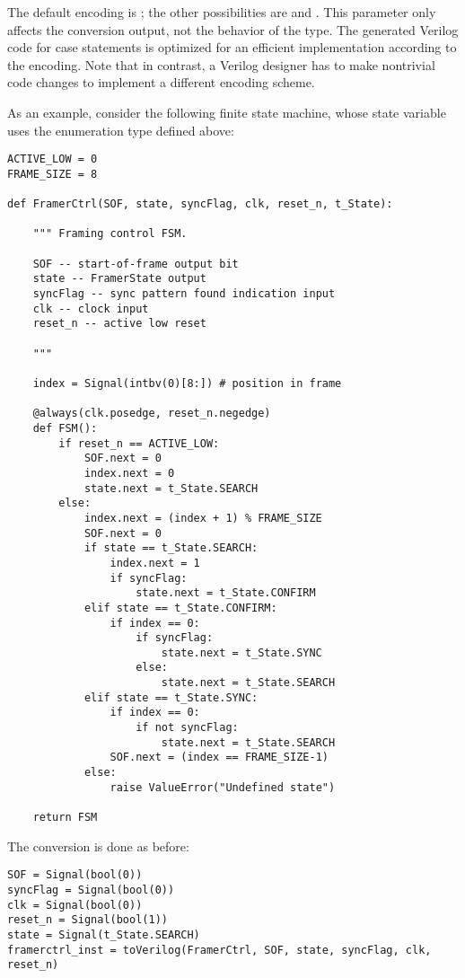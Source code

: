 The default encoding is ; the other possibilities are
 and . This parameter only affects
the conversion output, not the behavior of the type.  The generated
Verilog code for case statements is optimized for an efficient
implementation according to the encoding. Note that in contrast, a
Verilog designer has to make nontrivial code changes to implement a
different encoding scheme.

As an example, consider the following finite state machine, whose
state variable uses the enumeration type defined above:

\begin{verbatim}
ACTIVE_LOW = 0
FRAME_SIZE = 8

def FramerCtrl(SOF, state, syncFlag, clk, reset_n, t_State):
    
    """ Framing control FSM.

    SOF -- start-of-frame output bit
    state -- FramerState output
    syncFlag -- sync pattern found indication input
    clk -- clock input
    reset_n -- active low reset
    
    """
    
    index = Signal(intbv(0)[8:]) # position in frame

    @always(clk.posedge, reset_n.negedge)
    def FSM():
        if reset_n == ACTIVE_LOW:
            SOF.next = 0
            index.next = 0
            state.next = t_State.SEARCH
        else:
            index.next = (index + 1) % FRAME_SIZE
            SOF.next = 0
            if state == t_State.SEARCH:
                index.next = 1
                if syncFlag:
                    state.next = t_State.CONFIRM
            elif state == t_State.CONFIRM:
                if index == 0:
                    if syncFlag:
                        state.next = t_State.SYNC
                    else:
                        state.next = t_State.SEARCH
            elif state == t_State.SYNC:
                if index == 0:
                    if not syncFlag:
                        state.next = t_State.SEARCH
                SOF.next = (index == FRAME_SIZE-1)
            else:
                raise ValueError("Undefined state")
            
    return FSM
\end{verbatim}

The conversion is done as before:

\begin{verbatim}
SOF = Signal(bool(0))
syncFlag = Signal(bool(0))
clk = Signal(bool(0))
reset_n = Signal(bool(1))
state = Signal(t_State.SEARCH)
framerctrl_inst = toVerilog(FramerCtrl, SOF, state, syncFlag, clk, reset_n)
\end{verbatim}

